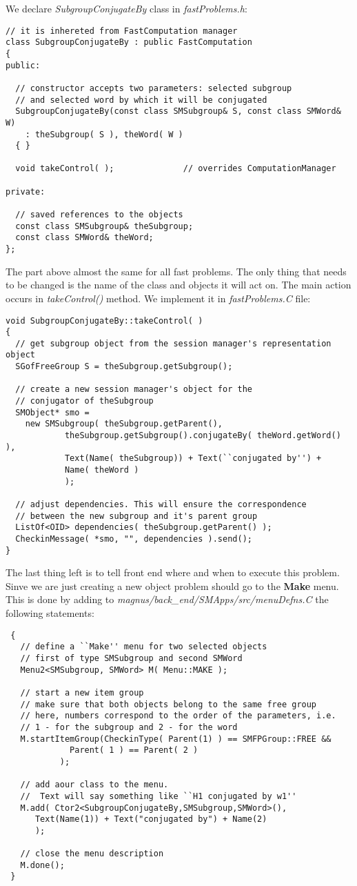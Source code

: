 \documentclass[12pt]{article}
\begin{document}
We declare \emph{SubgroupConjugateBy} class in \emph{fastProblems.h}:
\footnotesize
\begin{verbatim}
// it is inhereted from FastComputation manager
class SubgroupConjugateBy : public FastComputation
{
public:

  // constructor accepts two parameters: selected subgroup
  // and selected word by which it will be conjugated
  SubgroupConjugateBy(const class SMSubgroup& S, const class SMWord& W)
    : theSubgroup( S ), theWord( W )
  { }

  void takeControl( );              // overrides ComputationManager

private:

  // saved references to the objects
  const class SMSubgroup& theSubgroup;
  const class SMWord& theWord;
};
\end{verbatim}
\normalsize

The part above almost the same for all fast problems. The only thing
that needs to be changed is the name of the class and objects it will
act on. The main action occurs in  \emph{takeControl()} method. We implement
it in \emph{fastProblems.C} file:
\footnotesize
\begin{verbatim}
void SubgroupConjugateBy::takeControl( )
{
  // get subgroup object from the session manager's representation object
  SGofFreeGroup S = theSubgroup.getSubgroup();

  // create a new session manager's object for the
  // conjugator of theSubgroup
  SMObject* smo =
    new SMSubgroup( theSubgroup.getParent(),
		    theSubgroup.getSubgroup().conjugateBy( theWord.getWord() ),
		    Text(Name( theSubgroup)) + Text(``conjugated by'') + 
			Name( theWord )
		    );
  
  // adjust dependencies. This will ensure the correspondence
  // between the new subgroup and it's parent group
  ListOf<OID> dependencies( theSubgroup.getParent() );
  CheckinMessage( *smo, "", dependencies ).send();
}
\end{verbatim}
\normalsize 

The last thing left is to tell front end where and when to execute
this problem. Sinve we are just creating a new object problem 
should go to the \textbf{Make} menu.
 This is done by adding to \emph{magnus/back\_end/SMApps/src/menuDefns.C}
the following statements:
\footnotesize
\begin{verbatim}
 {
   // define a ``Make'' menu for two selected objects
   // first of type SMSubgroup and second SMWord
   Menu2<SMSubgroup, SMWord> M( Menu::MAKE );
   
   // start a new item group
   // make sure that both objects belong to the same free group
   // here, numbers correspond to the order of the parameters, i.e.
   // 1 - for the subgroup and 2 - for the word
   M.startItemGroup(CheckinType( Parent(1) ) == SMFPGroup::FREE &&
		     Parent( 1 ) == Parent( 2 )
		   );
   
   // add aour class to the menu.
   //  Text will say something like ``H1 conjugated by w1''
   M.add( Ctor2<SubgroupConjugateBy,SMSubgroup,SMWord>(),
	  Text(Name(1)) + Text("conjugated by") + Name(2)
	  );

   // close the menu description 
   M.done();
 }
\end{verbatim}
\normalsize 
\end{document}
